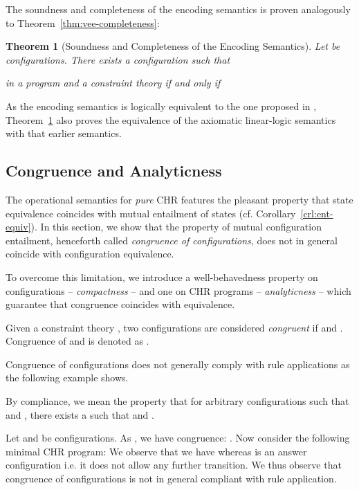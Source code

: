 \documentclass[acmtocl]{acmtrans2m}
\newtheorem{theorem}{Theorem}[section]
\begin{document}
The soundness and completeness of the encoding semantics is proven analogously
to Theorem~\ref{thm:vee-completeness}:

\begin{theorem}[Soundness and Completeness of the Encoding Semantics]
  \label{theorem:chrv_embed_soundness_completeness}
  Let  be configurations. There exists a configuration  such that
  
  in a program  and a constraint theory  \emph{if and only if}
  
\end{theorem}

As the encoding semantics is logically equivalent to the one proposed in
, Theorem~\ref{theorem:chrv_embed_soundness_completeness}
also proves the equivalence of the axiomatic linear-logic semantics with that
earlier semantics.

\subsection{Congruence and Analyticness}
\label{sec:vee-congruence}

The operational semantics  for \emph{pure} CHR features the pleasant
property that state equivalence coincides with mutual entailment of states (cf.
Corollary~\ref{crl:ent-equiv}). In this section, we show that the property of
mutual configuration entailment, henceforth called \emph{congruence of
configurations}, does not in general coincide with configuration equivalence.

To overcome this limitation, we introduce a well-behavedness property on
configurations -- \emph{compactness} -- and one on CHR programs --
\emph{analyticness} -- which guarantee that congruence coincides with equivalence.

\begin{definition} Given a constraint theory ,
two configurations  are considered \emph{congruent} if  and
. Congruence of  and  is denoted as .
\end{definition}

Congruence of configurations does not generally comply with rule applications
as the following example shows.

\begin{example} By compliance, we mean the
property that for arbitrary configurations  such that
 and , there exists a  such that
 and .

Let  and  be
configurations. As , we have congruence:
. Now consider the following minimal CHR program:  We observe that we have 
whereas  is an answer configuration i.e. it does not allow any further
transition. We thus observe that congruence of configurations is not in general
compliant with rule application.
\end{example}
\end{document}

